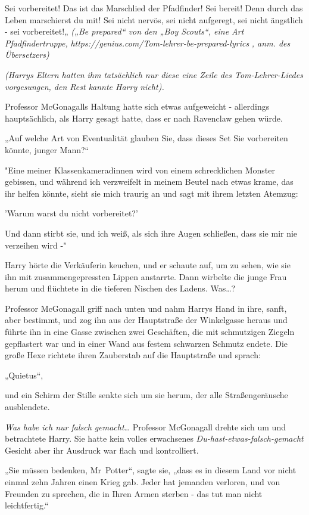{Sei vorbereitet! Das ist das Marschlied der Pfadfinder! Sei bereit! Denn durch das Leben marschierst du mit! Sei nicht nervös, sei nicht aufgeregt, sei nicht ängstlich - sei vorbereitet!„ \emph{(„Be prepared“ von den „Boy Scouts“, eine Art Pfadfindertruppe,} \emph{https://genius.com/Tom-lehrer-be-prepared-lyrics} \emph{, anm. des Übersetzers)}

\emph{(Harrys Eltern hatten ihm tatsächlich nur diese eine Zeile des Tom-Lehrer-Liedes vorgesungen, den Rest kannte Harry nicht).}

Professor McGonagalls Haltung hatte sich etwas aufgeweicht - allerdings hauptsächlich, als Harry gesagt hatte, dass er nach Ravenclaw gehen würde.

„Auf welche Art von Eventualität glauben Sie, dass dieses Set Sie vorbereiten könnte, junger Mann?“

"Eine meiner Klassenkameradinnen wird von einem schrecklichen Monster gebissen, und während ich verzweifelt in meinem Beutel nach etwas krame, das ihr helfen könnte, sieht sie mich traurig an und sagt mit ihrem letzten Atemzug:

'Warum warst du nicht vorbereitet?'

Und dann stirbt sie, und ich weiß, als sich ihre Augen schließen, dass sie mir nie verzeihen wird -"

Harry hörte die Verkäuferin keuchen, und er schaute auf, um zu sehen, wie sie ihn mit zusammengepressten Lippen anstarrte. Dann wirbelte die junge Frau herum und flüchtete in die tieferen Nischen des Ladens. Was…?

Professor McGonagall griff nach unten und nahm Harrys Hand in ihre, sanft, aber bestimmt, und zog ihn aus der Hauptstraße der Winkelgasse heraus und führte ihn in eine Gasse zwischen zwei Geschäften, die mit schmutzigen Ziegeln gepflastert war und in einer Wand aus festem schwarzen Schmutz endete. Die große Hexe richtete ihren Zauberstab auf die Hauptstraße und sprach:

„Quietus“,

und ein Schirm der Stille senkte sich um sie herum, der alle Straßengeräusche ausblendete.

\emph{Was habe ich nur falsch gemacht}… Professor McGonagall drehte sich um und betrachtete Harry. Sie hatte kein volles erwachsenes \emph{Du-hast-etwas-falsch-gemacht} Gesicht aber ihr Ausdruck war flach und kontrolliert.

„Sie müssen bedenken, Mr~Potter“, sagte sie, „dass es in diesem Land vor nicht einmal zehn Jahren einen Krieg gab. Jeder hat jemanden verloren, und von Freunden zu sprechen, die in Ihren Armen sterben - das tut man nicht leichtfertig.“

}
